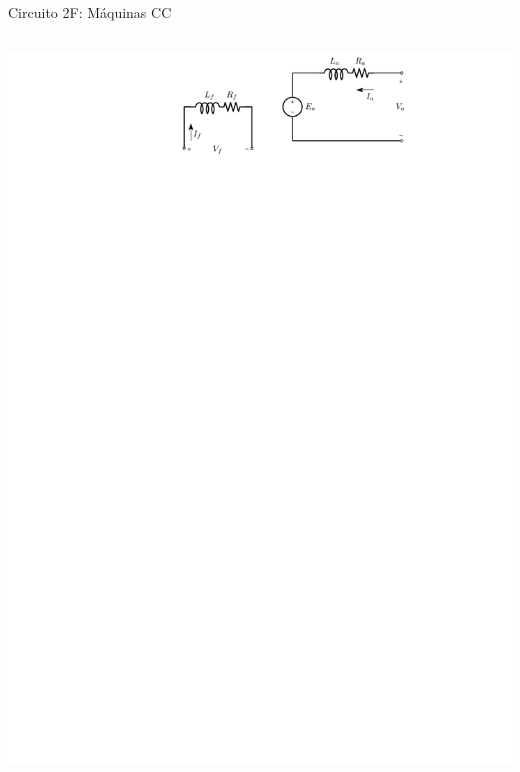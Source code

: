 \begin{frame}{Circuito 2F: Máquinas CC}
\begin{columns}
\includegraphics[width=0.95\linewidth]{./figuras/Segundo-Circuito/SIMf_dc_machine}

\end{columns}

\end{frame}





